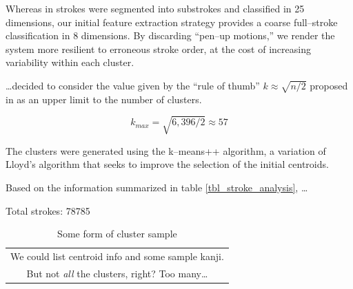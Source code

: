 \documentclass[10pt,conference,a4paper]{IEEEtran}
\begin{document}
	Whereas in \cite{nakai2001substroke} strokes were segmented into substrokes and classified in
	25 dimensions, our initial feature extraction strategy provides a coarse full--stroke classification
	in 8 dimensions. By discarding ``pen--up motions,'' we render the system more resilient to erroneous
	stroke order, at the cost of increasing variability within each cluster.


	\ldots decided to consider the value given by the ``rule of thumb'' $k \approx \sqrt{n / 2}$ proposed in \cite{mardia2005multivariate}
	as an upper limit to the number of clusters.

	$$ k_{max} = \sqrt{6,396 / 2} \approx 57 $$

	The clusters were generated using the k--means++ algorithm,
	a variation of Lloyd's algorithm that seeks to improve the selection of the initial centroids. \cite{arthur2007k}

	Based on the information summarized in table \ref{tbl_stroke_analysis}, \ldots

	Total strokes: 78785

	\begin{table}
		\renewcommand{\arraystretch}{1.3}
		\caption{Some form of cluster sample}
		\label{tbl_sample_clusters}
		\centering
		\begin{tabular}{c}
			We could list centroid info and some sample kanji. \\
			But not \emph{all} the clusters, right? Too many\ldots \\
		\end{tabular}
	\end{table}




\end{document}
